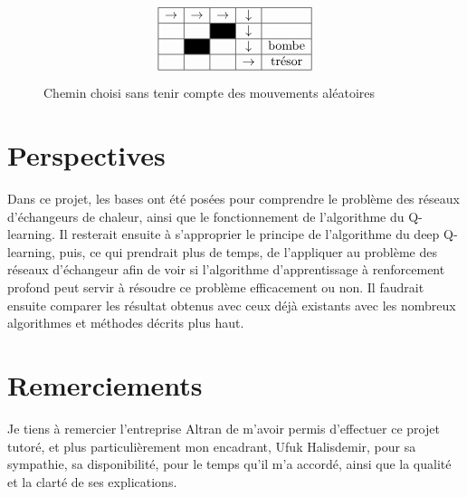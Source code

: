 \begin{figure}[!h]
\centering
$$\begin{array}{|c|c|c|c|c|}
\hline
\rightarrow & \rightarrow & \rightarrow & \downarrow & \\
\hline
  &  & \cellcolor{black} & \downarrow &  \\
\hline
 & \cellcolor{black} &  & \downarrow & \text{bombe} \\
\hline
 &  &  & \rightarrow &  \text{trésor}\\
\hline
\end{array}
$$
\caption{Chemin choisi sans tenir compte des mouvements aléatoires}
\end{figure}

\section{Perspectives}

Dans ce projet, les bases ont été posées pour comprendre le problème des réseaux d'échangeurs de chaleur, ainsi que le fonctionnement de l'algorithme du Q-learning. Il resterait ensuite à s'approprier le principe de l'algorithme du deep Q-learning, puis, ce qui prendrait plus de temps, de l'appliquer au problème des réseaux d'échangeur afin de voir si l'algorithme d'apprentissage à renforcement profond peut servir à résoudre ce problème efficacement ou non. Il faudrait ensuite comparer les résultat obtenus avec ceux déjà existants avec les nombreux algorithmes et méthodes décrits plus haut. 

\section{Remerciements}

Je tiens à remercier l'entreprise Altran de m'avoir permis d'effectuer ce projet tutoré, et plus particulièrement mon encadrant, Ufuk Halisdemir, pour sa sympathie, sa disponibilité, pour le temps qu'il m'a accordé, ainsi que la qualité et la clarté de ses explications. 

\nocite{*}


